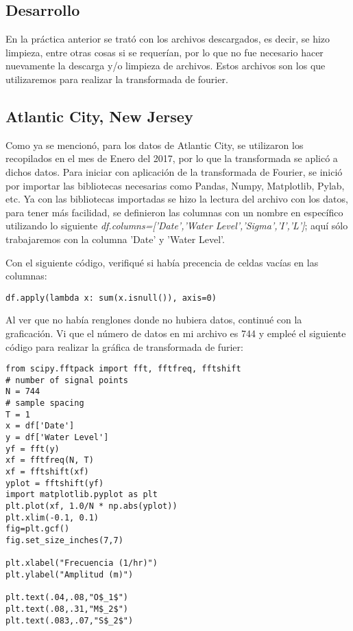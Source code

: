 \documentclass[12pt]{article}
\begin{document}
\begin{doublespace}
\section{Desarrollo}

En la práctica anterior se trató con los archivos descargados, es decir, se hizo limpieza, entre otras cosas si se requerían, por lo que no fue necesario hacer nuevamente la descarga y/o limpieza de archivos. Estos archivos son los que utilizaremos para realizar la transformada de fourier.

\subsection{Atlantic City, New Jersey}

Como ya se mencionó, para los datos de Atlantic City, se utilizaron los recopilados en el mes de Enero del 2017, por lo que la transformada se aplicó a dichos datos. Para iniciar con aplicación de la transformada de Fourier, se inició por importar las bibliotecas necesarias como Pandas, Numpy, Matplotlib, Pylab, etc. Ya con las bibliotecas importadas se hizo la lectura del archivo con los datos, para tener más facilidad, se definieron las columnas con un nombre en específico utilizando lo siguiente \textit{df.columns=['Date','Water Level','Sigma','I','L']}; aquí sólo trabajaremos con la columna 'Date' y 'Water Level'. 

Con el siguiente código, verifiqué si había precencia de celdas vacías en las columnas:
\begin{verbatim}
df.apply(lambda x: sum(x.isnull()), axis=0)
\end{verbatim}

Al ver que no había renglones donde no hubiera datos, continué con la graficación. Vi que el número de datos en mi archivo es 744 y empleé el siguiente código para realizar la gráfica de transformada de furier:

\begin{verbatim}
from scipy.fftpack import fft, fftfreq, fftshift
# number of signal points
N = 744
# sample spacing
T = 1
x = df['Date']
y = df['Water Level']
yf = fft(y)
xf = fftfreq(N, T)
xf = fftshift(xf)
yplot = fftshift(yf)
import matplotlib.pyplot as plt
plt.plot(xf, 1.0/N * np.abs(yplot))
plt.xlim(-0.1, 0.1)
fig=plt.gcf()
fig.set_size_inches(7,7)

plt.xlabel("Frecuencia (1/hr)")
plt.ylabel("Amplitud (m)")

plt.text(.04,.08,"O$_1$")
plt.text(.08,.31,"M$_2$")
plt.text(.083,.07,"S$_2$")


\end{verbatim}
\end{doublespace}
\end{document}
